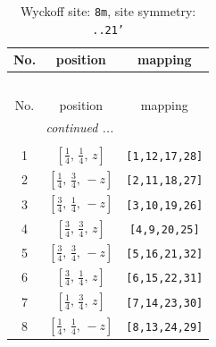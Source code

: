 \documentclass[fleqn,8pt]{jsarticle}
\begin{document}
\renewcommand{\arraystretch}{1.2}
\begin{longtable}{ccc}
\caption{Wyckoff site: {\tt 8m}, site symmetry: {\tt ..21'}}
 \\
 \hline \hline
No. & position & mapping \\ \hline \endfirsthead

\multicolumn{2}{l}{\tablename\ \thetable{}} \\
 \hline \hline
No. & position & mapping \\ \hline \endhead

 \hline \hline
\multicolumn{2}{r}{\footnotesize\it continued ...} \\ \endfoot

 \hline \hline
\multicolumn{2}{r}{} \\ \endlastfoot

1 & $\left[ \frac{1}{4},\, \frac{1}{4},\, z \right]$ & {\tt [1,12,17,28]} \\ \hline
2 & $\left[ \frac{1}{4},\, \frac{3}{4},\, - z \right]$ & {\tt [2,11,18,27]} \\ \hline
3 & $\left[ \frac{3}{4},\, \frac{1}{4},\, - z \right]$ & {\tt [3,10,19,26]} \\ \hline
4 & $\left[ \frac{3}{4},\, \frac{3}{4},\, z \right]$ & {\tt [4,9,20,25]} \\ \hline
5 & $\left[ \frac{3}{4},\, \frac{3}{4},\, - z \right]$ & {\tt [5,16,21,32]} \\ \hline
6 & $\left[ \frac{3}{4},\, \frac{1}{4},\, z \right]$ & {\tt [6,15,22,31]} \\ \hline
7 & $\left[ \frac{1}{4},\, \frac{3}{4},\, z \right]$ & {\tt [7,14,23,30]} \\ \hline
8 & $\left[ \frac{1}{4},\, \frac{1}{4},\, - z \right]$ & {\tt [8,13,24,29]} \\
\end{longtable}
\renewcommand{\arraystretch}{1.2}
\end{document}
